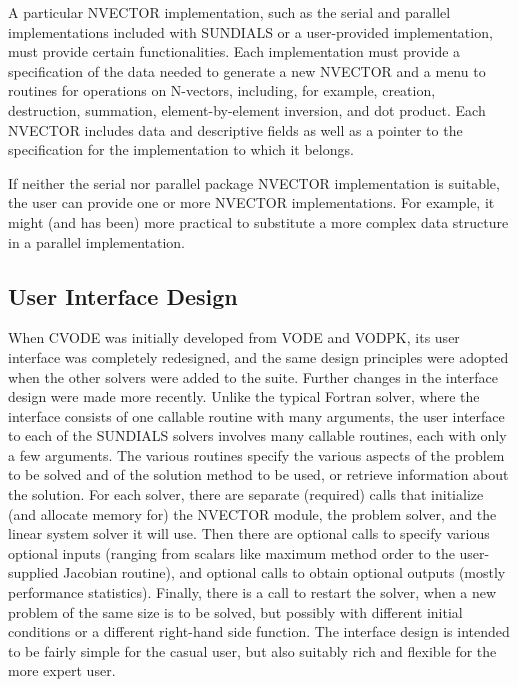 A particular NVECTOR implementation, such as the serial and parallel 
implementations included with SUNDIALS or a user-provided implementation,
must provide certain functionalities. Each implementation must provide a
specification of the data needed to generate a new NVECTOR and a menu to
routines for operations on N-vectors, including, for example, creation,
destruction, summation, element-by-element inversion, and dot product. Each
NVECTOR includes data and descriptive fields as well as a pointer to the
specification for the implementation to which it belongs.

If neither the serial nor parallel package NVECTOR implementation is
suitable, the user can provide one or more NVECTOR implementations.  For
example, it might (and has been) more practical to substitute a more complex
data structure in a parallel implementation.

\subsection{User Interface Design}

When CVODE was initially developed from VODE and VODPK, its user
interface was completely redesigned, and the same design principles
were adopted when the other solvers were added to the suite.  Further
changes in the interface design were made more recently.  Unlike the
typical Fortran solver, where the interface consists of one callable
routine with many arguments, the user interface to each of the
SUNDIALS solvers involves many callable routines, each with only a few
arguments.  The various routines specify the various aspects of the
problem to be solved and of the solution method to be used, or
retrieve information about the solution.  For each solver, there are
separate (required) calls that initialize (and allocate memory for)
the NVECTOR module, the problem solver, and the linear system solver
it will use.  Then there are optional calls to specify various
optional inputs (ranging from scalars like maximum method order to the
user-supplied Jacobian routine), and optional calls to obtain optional
outputs (mostly performance statistics).  Finally, there is a call to
restart the solver, when a new problem of the same size is to be
solved, but possibly with different initial conditions or a different
right-hand side function.  The interface design is intended to be
fairly simple for the casual user, but also suitably rich and flexible
for the more expert user.
